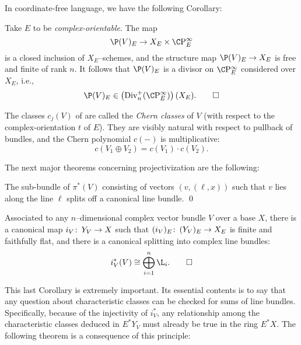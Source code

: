 In coordinate-free language, we have the following Corollary:
\begin{corollary}
Take $E$ to be \emph{complex-orientable}.  The map \[\P(V)_E \to X_E \times \CP^\infty_E\] is a closed inclusion of $X_E$--schemes, and the structure map $\P(V)_E \to X_E$ is free and finite of rank $n$.  It follows that $\P(V)_E$ is a divisor on $\CP^\infty_E$ considered over $X_E$, i.e., \[\P(V)_E \in \left(\Div_n^+(\CP^\infty_E)\right)(X_E). \qed\]
\end{corollary}

\begin{definition}
The classes $c_j(V)$ of  are called the \textit{Chern classes} of $V$ (with respect to the complex-orientation $t$ of $E$).  They are visibly natural with respect to pullback of bundles, and the Chern polynomial $c(-)$ is multiplicative: \[c(V_1 \oplus V_2) = c(V_1) \cdot c(V_2).\]
\end{definition}

The next major theorems concerning projectivization are the following:

\begin{corollary}
The sub-bundle of $\pi^*(V)$ consisting of vectors $(v, (\ell, x))$ such that $v$ lies along the line $\ell$ splits off a canonical line bundle. \qed
\end{corollary}

\begin{corollary}\label{OriginalSplittingPrinciple}
Associated to any $n$--dimensional complex vector bundle $V$ over a base $X$, there is a canonical map $i_V\colon\thinspace Y_V \to X$ such that $(i_V)_E\colon\thinspace (Y_V)_E \to X_E$ is finite and faithfully flat, and there is a canonical splitting into complex line bundles: \[i_V^*(V) \cong \bigoplus_{i=1}^n \L_i. \qed\]
\end{corollary}

This last Corollary is extremely important.  Its essential contents is to say that any question about characteristic classes can be checked for sums of line bundles.  Specifically, because of the injectivity of $i_V^*$, any relationship among the characteristic classes deduced in $E^* Y_V$ must already be true in the ring $E^* X$.  The following theorem is a consequence of this principle:

